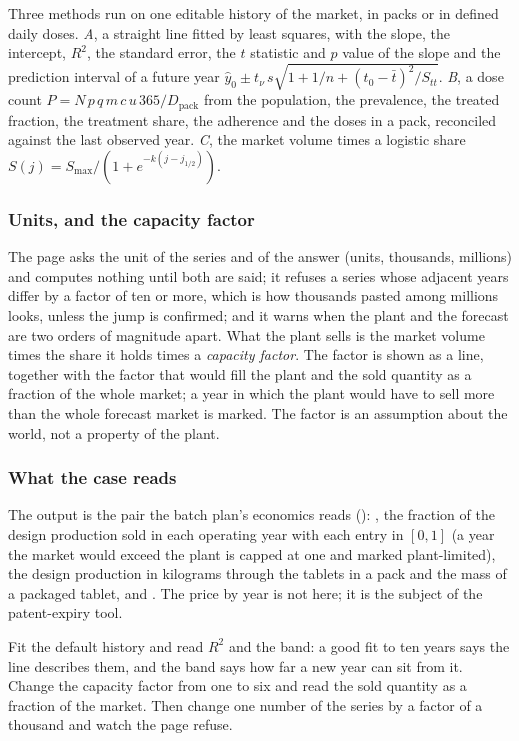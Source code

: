 \documentclass[11pt,a4paper]{article}
\begin{document}
Three methods run on one editable history of the market, in packs or in
defined daily doses.  \emph{A}, a straight line fitted by least squares, with
the slope, the intercept, $R^{2}$, the standard error, the $t$ statistic and
$p$ value of the slope and the prediction interval of a future year
$\hat y_0\pm t_{\nu}\,s\sqrt{1+1/n+(t_0-\bar t)^2/S_{tt}}$.  \emph{B}, a dose
count $P=N\,p\,q\,m\,c\,u\,365/D_{\mathrm{pack}}$ from the population, the
prevalence, the treated fraction, the treatment share, the adherence and the
doses in a pack, reconciled against the last observed year.  \emph{C}, the
market volume times a logistic share $S(j)=S_{\max}/(1+e^{-k(j-j_{1/2})})$.

\subsubsection*{Units, and the capacity factor}

The page asks the unit of the series and of the answer (units, thousands,
millions) and computes nothing until both are said; it refuses a series
whose adjacent years differ by a factor of ten or more, which is how
thousands pasted among millions looks, unless the jump is confirmed; and it
warns when the plant and the forecast are two orders of magnitude apart.
What the plant sells is the market volume times the share it holds times a
\emph{capacity factor}.  The factor is shown as a line, together with the
factor that would fill the plant and the sold quantity as a fraction of the
whole market; a year in which the plant would have to sell more than the whole
forecast market is marked.  The factor is an assumption about the world, not a
property of the plant.

\subsubsection*{What the case reads}

The output is the pair the batch plan's economics reads
(): , the fraction of
the design production sold in each operating year with each entry in
$[0,1]$ (a year the market would exceed the plant is capped at one and marked
plant-limited), the design production in kilograms through the tablets in a
pack and the mass of a packaged tablet, and .
The price by year is not here; it is the subject of the patent-expiry tool.

\begin{tryit}
Fit the default history and read $R^{2}$ and the band: a good fit to ten years
says the line describes them, and the band says how far a new year can sit
from it.  Change the capacity factor from one to six and read the sold
quantity as a fraction of the market.  Then change one number of the series
by a factor of a thousand and watch the page refuse.
\end{tryit}
\end{document}
